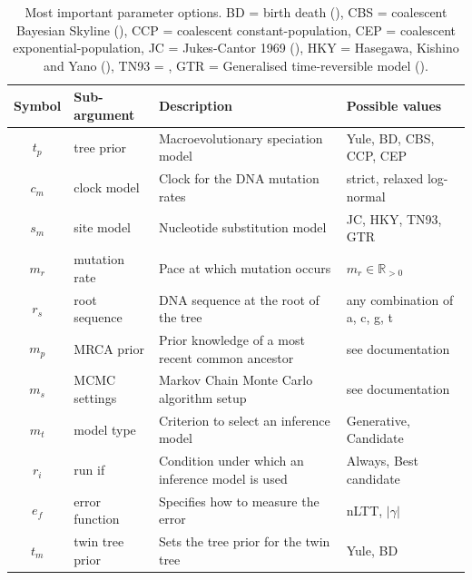\documentclass{article}
\begin{document}
\begin{table}
\centering
  \begin{tabular}{|@{}c|p{2.5cm}|p{9cm}|p{4.5cm}@{}|}
    \hline
    \centering
    \textbf{Symbol} & \textbf{Sub-argument} & \textbf{Description} & \textbf{Possible values} \\ 
    \hline
    $\mathit{t_{p}}$ & tree prior & Macroevolutionary speciation model & Yule, BD, CBS, CCP, CEP \\
    $\mathit{c_{m}}$ & clock model & Clock for the DNA mutation rates & strict, relaxed log-normal \\
    $\mathit{s_{m}}$ & site model & Nucleotide substitution model & JC, HKY, TN93, GTR \\
    $\mathit{m_{r}}$ & mutation rate & Pace at which mutation occurs & $m_{r} \in \mathbb{R}_{>0}$\\
    $\mathit{r_{s}}$ & root sequence & DNA sequence at the root of the tree & any combination of a, c, g, t \\
    $\mathit{m_{p}}$ & MRCA prior & Prior knowledge of a most recent common ancestor & see documentation \\
    $\mathit{m_{s}}$ & MCMC settings & Markov Chain Monte Carlo algorithm setup & see documentation \\
    $\mathit{m_{t}}$ & model type & Criterion to select an inference model & Generative, Candidate \\
    $\mathit{r_{i}}$ & run if & Condition under which an inference model is used & Always, Best candidate\\
    $\mathit{e_{f}}$ & error function & Specifies how to measure the error & nLTT, $|\gamma|$ \\
    $\mathit{t_{m}}$ & twin tree prior & Sets the tree prior for the twin tree & Yule, BD \\
    \hline
  \end{tabular}
  \caption{
    Most important parameter options. 
    BD = birth death (\cite{nee1994reconstructed}), 
    CBS = coalescent Bayesian Skyline (\cite{drummond2005bayesian}), 
    CCP = coalescent constant-population, 
    CEP = coalescent exponential-population,
    JC = Jukes-Cantor 1969 (\cite{jukes1969evolution}), 
    HKY = Hasegawa, Kishino and  Yano (\cite{hasegawa1985dating}), 
    TN93 = \cite{tamura1993estimation}, 
    GTR = Generalised time-reversible model (\cite{tavare1986some}).
  }
  \label{tab:options}
\bigskip


\end{table}
\end{document}
